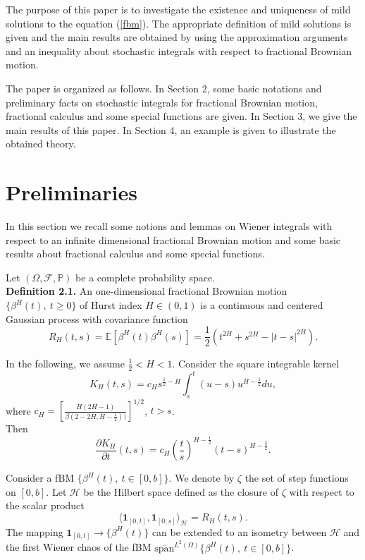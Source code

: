 \documentclass[12pt,a4paper,oneside,reqno,notitlepage]{amsart}
\theoremstyle{plain}
\numberwithin{equation}{section}
\begin{document}
The purpose of this paper is to investigate the existence and uniqueness of mild solutions to the equation (\ref{fbm}). The appropriate definition of mild solutions is given and the main results are obtained by using the approximation arguments and an inequality about stochastic integrals with respect to fractional Brownian motion.

The paper is organized as follows. In Section 2, some basic notations and preliminary facts on stochastic integrals for fractional Brownian motion, fractional calculus and some special functions are given. In Section 3, we give the main results of this paper. In Section 4, an example is given to illustrate the obtained theory.

\section{Preliminaries}
In this section we recall some notions and lemmas on Wiener integrals with respect to an infinite dimensional fractional Brownian motion and some basic results about fractional calculus and some special functions.


Let $(\Omega,\mathcal{F},\mathbb{P})$ be a complete probability space. \\
\textbf{Definition 2.1.} An one-dimensional fractional Brownian motion $\{\beta^{H}(t),\ t\geq0\}$ of Hurst index $H\in(0,1)$ is a continuous and centered
Gaussian process with covariance function
\begin{equation*}
R_{H}(t,s)=\mathbb{E}[\beta^{H}(t)\beta^{H}(s)]=\frac{1}{2}(t^{2H}+s^{2H}-|t-s|^{2H}).
\end{equation*}


In the following, we assume $\frac{1}{2}<H<1$.
Consider the square integrable kernel
\begin{equation*}
K_{H}(t,s)=c_{H}s^{\frac{1}{2}-H}\int_{s}^{t}(u-s)u^{H-\frac{1}{2}}du,
\end{equation*}
where $c_{H}=\left[\frac{H(2H-1)}{\beta(2-2H,H-\frac{1}{2}))}\right]^{1/2}$, $t>s$.\\
Then
\begin{equation*}
\frac{\partial K_{H}}{\partial t}(t,s)=c_{H}\left(\frac{t}{s}\right)^{H-\frac{1}{2}}(t-s)^{H-\frac{3}{2}}.
\end{equation*}


Consider a fBM $\{\beta^{H}(t), \ t\in[0,b]\}$. We denote by $\zeta$ the set of step functions on $[0,b]$. Let $\mathcal{H}$ be the Hilbert space defined as
the closure of $\zeta$ with respect to the scalar product
\begin{equation*}
\langle \textbf{1}_{[0,t]}, \textbf{1}_{[0,s]}\rangle_{\mathcal{H}}=R_{H}(t,s).
\end{equation*}
The mapping $\textbf{1}_{[0,t]}\rightarrow \{\beta^{H}(t)\}$ can be extended to an isometry between $\mathcal{H}$ and the first
Wiener chaos of the fBM $\overline{\mbox{span}}^{L^{2}(\Omega)}\{\beta^{H}(t), \ t\in[0,b]\}$.
\end{document}
